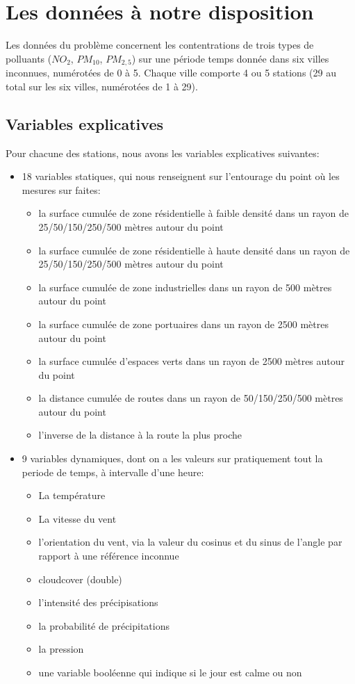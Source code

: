 \section{Les données à notre disposition}

Les données du problème concernent les contentrations de trois types de polluants ($NO_2$, $PM_{10}$, $PM_{2,5}$) sur une période temps donnée dans six villes inconnues, numérotées de 0 à 5.
Chaque ville comporte 4 ou 5 stations (29 au total sur les six villes, numérotées de 1 à 29).

\subsection{Variables explicatives}

Pour chacune des stations, nous avons les variables explicatives suivantes:
\begin{itemize}
  \item 18 variables statiques, qui nous renseignent sur l'entourage du point où les mesures sur faites:
  \begin{itemize}
    \item la surface cumulée de zone résidentielle à faible densité dans un rayon de 25/50/150/250/500 mètres autour du point
    \item la surface cumulée de zone résidentielle à haute densité dans un rayon de 25/50/150/250/500 mètres autour du point
    \item la surface cumulée de zone industrielles dans un rayon de 500 mètres autour du point
    \item la surface cumulée de zone portuaires dans un rayon de 2500 mètres autour du point
    \item la surface cumulée d'espaces verts dans un rayon de 2500 mètres autour du point
    \item la distance cumulée de routes dans un rayon de 50/150/250/500 mètres autour du point
    \item l'inverse de la distance à la route la plus proche
  \end{itemize}
  \item 9 variables dynamiques, dont on a les valeurs sur pratiquement tout la periode de temps, à intervalle d'une heure:
  \begin{itemize}
    \item La température
    \item La vitesse du vent
    \item l'orientation du vent, via la valeur du cosinus et du sinus de l'angle par rapport à une référence inconnue
    \item cloudcover (double)
    \item l'intensité des précipisations
    \item la probabilité de précipitations
    \item la pression
    \item une variable booléenne qui indique si le jour est calme ou non
  \end{itemize}
\end{itemize}

